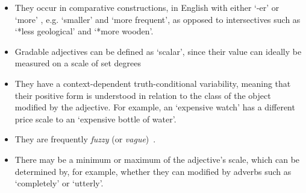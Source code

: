 \documentclass[11pt]{article}
\begin{document}
\begin{itemize}[noitemsep]
\item They occur in comparative constructions, in English with either `-er' or `more' \cite{kennedy1999scalar}, e.g. `smaller' and `more frequent', as opposed to intersectives such as `*less geological' and `*more wooden'.
\item Gradable adjectives can be defined as `scalar', since their value can ideally be measured on a scale of set degrees
\item They have a context-dependent truth-conditional variability, meaning that their positive form
    is understood in relation to the class of the object modified by the adjective. For example, an
    `expensive watch' has a different price scale to an `expensive bottle of water'.
\item They are frequently \emph{fuzzy} (or \emph{vague})~\cite{kennedy2007vagueness}.

\item There may be a minimum or maximum of the adjective's scale, which can be determined
by, for example, whether they can modified by adverbs such as `completely' or `utterly'.
\end{itemize}
\end{document}
